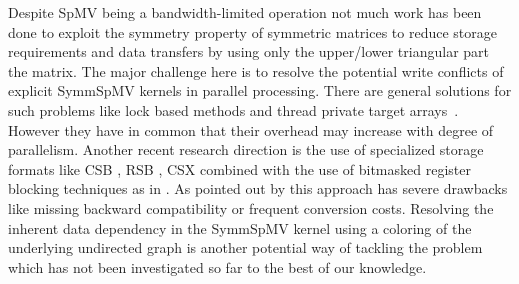 


Despite \acrshort{SpMV} being a bandwidth-limited operation not much work has 
been done to exploit the symmetry property of symmetric matrices to reduce
storage requirements and data transfers by using only the upper/lower triangular part the matrix.
The major challenge here is to resolve the potential write conflicts of explicit \acrshort{SymmSpMV} kernels in parallel processing.
There are general solutions for such problems like 
lock based methods and thread private target
arrays~\cite{sparseX,thread_private_symm_spmv,Krotkiewski:2010:PSS:1752612.1752682,Mironowicz:2015}. However they have in common that their overhead may increase with degree of parallelism.
Another recent research direction is the use of specialized storage formats 
like CSB \cite{CSB}, RSB \cite{RSB}, CSX \cite{sparseX} combined with the use of bitmasked 
register blocking techniques as in \cite{Buluc:2011:RMA:2058524.2059503}. As pointed out 
by \cite{liu2015spmv} this approach has severe drawbacks like missing backward compatibility or frequent conversion costs.  
Resolving the inherent data dependency in the \acrshort{SymmSpMV} kernel using a \DTWO coloring of the underlying undirected graph is another potential way of tackling the problem which has not been investigated so far to the best of our knowledge.


